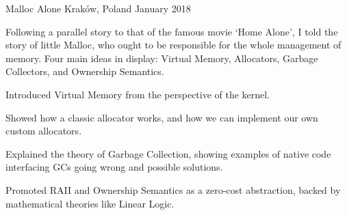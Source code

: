 
\begin{cventries}

    {Malloc Alone} %
    {Kraków, Poland} %
    {January 2018} %
    {
        \begin{cvitems} %
        \item {Following a parallel story to that of the famous movie `Home Alone', I told the story
                of little Malloc, who ought to be responsible for the whole management of memory. Four
                main ideas in display: Virtual Memory, Allocators, Garbage Collectors, and Ownership
            Semantics.}
        \item {Introduced Virtual Memory from the perspective of the kernel.}
        \item {Showed how a classic allocator works, and how we can implement our own custom
            allocators.}
        \item {Explained the theory of Garbage Collection, showing examples of native code
            interfacing GCs going wrong and possible solutions.}
        \item {Promoted RAII and Ownership Semantics as a zero-cost abstraction, backed by
            mathematical theories like Linear Logic.}
        \end{cvitems}
    }


\end{cventries}

